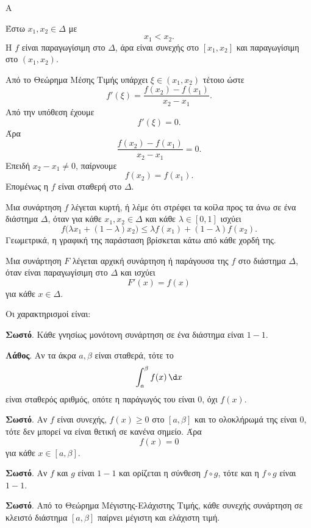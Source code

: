 \begin{thema}{Α}
\begin{erwthma}
\item Έστω $x_1,x_2\in\varDelta$ με
\[
x_1<x_2.
\]
Η $f$ είναι παραγωγίσιμη στο $\varDelta$, άρα είναι συνεχής στο $[x_1,x_2]$ και παραγωγίσιμη στο $(x_1,x_2)$.

Από το Θεώρημα Μέσης Τιμής υπάρχει $\xi\in(x_1,x_2)$ τέτοιο ώστε
\[
f'(\xi)=\frac{f(x_2)-f(x_1)}{x_2-x_1}.
\]
Από την υπόθεση έχουμε
\[
f'(\xi)=0.
\]
Άρα
\[
\frac{f(x_2)-f(x_1)}{x_2-x_1}=0.
\]
Επειδή $x_2-x_1\neq0$, παίρνουμε
\[
f(x_2)=f(x_1).
\]
Επομένως η $f$ είναι σταθερή στο $\varDelta$.

\item Μια συνάρτηση $f$ λέγεται κυρτή, ή λέμε ότι στρέφει τα κοίλα προς τα άνω σε ένα διάστημα $\varDelta$, όταν για κάθε $x_1,x_2\in\varDelta$ και κάθε $\lambda\in[0,1]$ ισχύει
\[
f\bigl(\lambda x_1+(1-\lambda)x_2\bigr)
\leq
\lambda f(x_1)+(1-\lambda)f(x_2).
\]
Γεωμετρικά, η γραφική της παράσταση βρίσκεται κάτω από κάθε χορδή της.

\item Μια συνάρτηση $F$ λέγεται αρχική συνάρτηση ή παράγουσα της $f$ στο διάστημα $\varDelta$, όταν είναι παραγωγίσιμη στο $\varDelta$ και ισχύει
\[
F'(x)=f(x)
\]
για κάθε $x\in\varDelta$.

\item Οι χαρακτηρισμοί είναι:
\begin{alist}
\item \textbf{Σωστό}. Κάθε γνησίως μονότονη συνάρτηση σε ένα διάστημα είναι $1-1$.
\item \textbf{Λάθος}. Αν τα άκρα $a,\beta$ είναι σταθερά, τότε το
\[
\dint_a^\beta f(x)\,\d x
\]
είναι σταθερός αριθμός, οπότε η παράγωγός του είναι $0$, όχι $f(x)$.
\item \textbf{Σωστό}. Αν $f$ είναι συνεχής, $f(x)\geq0$ στο $[a,\beta]$ και το ολοκλήρωμά της είναι $0$, τότε δεν μπορεί να είναι θετική σε κανένα σημείο. Άρα
\[
f(x)=0
\]
για κάθε $x\in[a,\beta]$.
\item \textbf{Σωστό}. Αν $f$ και $g$ είναι $1-1$ και ορίζεται η σύνθεση $f\circ g$, τότε και η $f\circ g$ είναι $1-1$.
\item \textbf{Σωστό}. Από το Θεώρημα Μέγιστης-Ελάχιστης Τιμής, κάθε συνεχής συνάρτηση σε κλειστό διάστημα $[a,\beta]$ παίρνει μέγιστη και ελάχιστη τιμή.
\end{alist}
\end{erwthma}
\end{thema}

